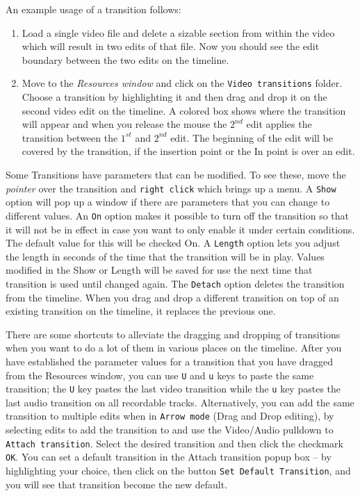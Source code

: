An example usage of a transition follows:
\begin{enumerate}
    \item Load a single video file and delete a sizable section from within the video which will result in two edits of that file. Now you should see the edit boundary between the two edits on the timeline.
    \item Move to the \textit{Resources window} and click on the \texttt{Video transitions} folder. Choose a transition by highlighting it and then drag and drop it on the second video edit on the timeline. A colored box shows where the transition will appear and when you release the mouse the $2^{nd}$ edit applies the transition between the $1^{st}$ and $2^{nd}$ edit.
The beginning of the edit will be covered by the transition, if the insertion point or the In point is over an edit.
\end{enumerate}
Some Transitions have parameters that can be modified. To see these, move the \textit{pointer} over the transition and \texttt{right click} which brings up a menu. A \texttt{Show} option will pop up a window if there are parameters that you can change to different values. 
An \texttt{On} option makes it possible to turn off the transition so that it will not be in effect in case you want to only enable it under certain conditions.  The default value for this will be checked On.
A \texttt{Length} option lets you adjust the length in seconds of the time that the transition will be in play.  Values modified in the Show or Length will be saved for use the next time that transition is used until changed again. 
The \texttt{Detach} option deletes the transition from the timeline. When you drag and drop a different transition on top of an existing transition on the timeline, it replaces the previous one.

There are some shortcuts to alleviate the dragging and dropping of transitions when you want to do a lot of them in various places on the timeline. After you have established the parameter values for a transition that you have dragged from the Resources window, you can use \texttt{U} and \texttt{u} keys to paste the same transition;
the \texttt{U} key pastes the last video transition while the \texttt{u} key pastes the last audio transition on all recordable tracks. 
Alternatively, you can add the same transition to multiple edits when in \texttt{Arrow mode} (Drag and Drop editing), by selecting edits to add the transition to and use the Video/Audio pulldown to \texttt{Attach transition}. Select the desired transition and then click the checkmark \texttt{OK}. You can set a default transition in the Attach transition popup box – by highlighting your choice, then click on the button \texttt{Set Default Transition}, and you will see that transition become the new default.

